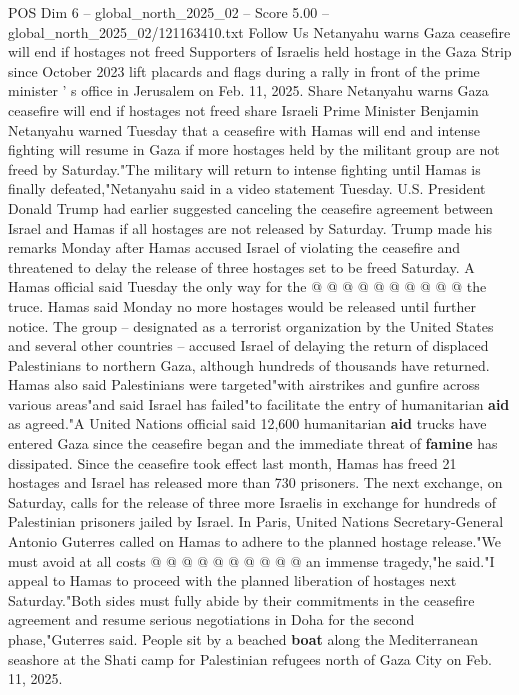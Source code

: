\begin{textsample}{POS Dim 6 – global\_north\_2025\_02 – Score 5.00 – global\_north\_2025\_02/121163410.txt}  \label{ex:f6_pos_363}
Follow Us Netanyahu warns Gaza ceasefire will end if hostages not freed Supporters of Israelis held hostage in the Gaza Strip since October 2023 lift placards and flags during a rally in front of the prime minister ' s office in Jerusalem on Feb. 11, 2025.
Share Netanyahu warns Gaza ceasefire will end if hostages not freed share Israeli Prime Minister Benjamin Netanyahu warned Tuesday that a ceasefire with Hamas will end and intense fighting will resume in Gaza if more hostages held by the militant group are not freed by Saturday."The military will return to intense fighting until Hamas is finally defeated,"Netanyahu said in a video statement Tuesday.
U.S.
President Donald Trump had earlier suggested canceling the ceasefire agreement between Israel and Hamas if all hostages are not released by Saturday.
Trump made his remarks Monday after Hamas accused Israel of violating the ceasefire and threatened to delay the release of three hostages set to be freed Saturday.
A Hamas official said Tuesday the only way for the @ @ @ @ @ @ @ @ @ @ the truce.
Hamas said Monday no more hostages would be released until further notice.
The group -- designated as a terrorist organization by the United States and several other countries -- accused Israel of delaying the return of displaced Palestinians to northern Gaza, although hundreds of thousands have returned.
Hamas also said Palestinians were targeted"with airstrikes and gunfire across various areas"and said Israel has failed"to facilitate the entry of humanitarian \textbf{aid} as agreed."A United Nations official said 12,600 humanitarian \textbf{aid} trucks have entered Gaza since the ceasefire began and the immediate threat of \textbf{famine} has dissipated.
Since the ceasefire took effect last month, Hamas has freed 21 hostages and Israel has released more than 730 prisoners.
The next exchange, on Saturday, calls for the release of three more Israelis in exchange for hundreds of Palestinian prisoners jailed by Israel.
In Paris, United Nations Secretary-General Antonio Guterres called on Hamas to adhere to the planned hostage release."We must avoid at all costs @ @ @ @ @ @ @ @ @ @ an immense tragedy,"he said."I appeal to Hamas to proceed with the planned liberation of hostages next Saturday."Both sides must fully abide by their commitments in the ceasefire agreement and resume serious negotiations in Doha for the second phase,"Guterres said.
People sit by a beached \textbf{boat} along the Mediterranean seashore at the Shati camp for Palestinian refugees north of Gaza City on Feb. 11, 2025.

\end{textsample}
